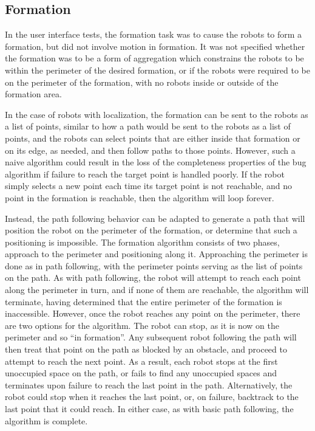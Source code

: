\subsection{Formation}

In the user interface tests, the formation task was to cause the robots to form a formation, but did not involve motion in formation. 
It was not specified whether the formation was to be a form of aggregation which constrains the robots to be within the perimeter of the desired formation, or if the robots were required to be on the perimeter of the formation, with no robots inside or outside of the formation area. 

In the case of robots with localization, the formation can be sent to the robots as a list of points, similar to how a path would be sent to the robots as a list of points, and the robots can select points that are either inside that formation or on its edge, as needed, and then follow paths to those points. 
However, such a naive algorithm could result in the loss of the completeness properties of the bug algorithm if failure to reach the target point is handled poorly. 
If the robot simply selects a new point each time its target point is not reachable, and no point in the formation is reachable, then the algorithm will loop forever. 

Instead, the path following behavior can be adapted to generate a path that will position the robot on the perimeter of the formation, or determine that such a positioning is impossible.
The formation algorithm consists of two phases, approach to the perimeter and positioning along it. 
Approaching the perimeter is done as in path following, with the perimeter points serving as the list of points on the path. 
As with path following, the robot will attempt to reach each point along the perimeter in turn, and if none of them are reachable, the algorithm will terminate, having determined that the entire perimeter of the formation is inaccessible. 
However, once the robot reaches any point on the perimeter, there are two options for the algorithm. 
The robot can stop, as it is now on the perimeter and so ``in formation''. 
Any subsequent robot following the path will then treat that point on the path as blocked by an obstacle, and proceed to attempt to reach the next point. 
As a result, each robot stops at the first unoccupied space on the path, or fails to find any unoccupied spaces and terminates upon failure to reach the last point in the path. 
Alternatively, the robot could stop when it reaches the last point, or, on failure, backtrack to the last point that it could reach.  
In either case, as with basic path following, the algorithm is complete. 

